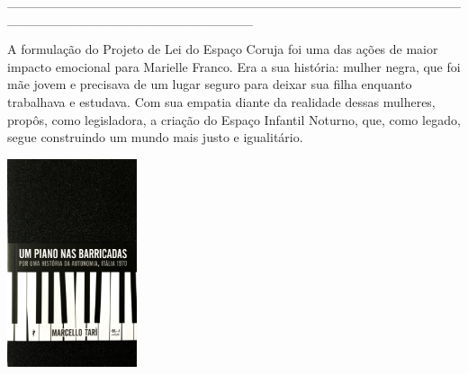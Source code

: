 {\hspace*{-2cm}\_\_\_\_\_\_\_\_\_\_\_\_\_\_\_\_\_\_\_\_\_\_\_\_\_\_\_\_\_\_\_\_\_\_\_\_\_\_\_\_\_\_\_\_\_\_\_\_\_\_\_\_\_\_\_\_\_\_\_\_\_\_\_\_\_\_\_\_\_\_\_\_\_\_

\medskip

\noindent{}A formulação do Projeto de Lei do Espaço Coruja foi uma das ações de maior impacto emocional para Marielle Franco. Era a sua história: mulher negra, que foi mãe jovem e precisava de um lugar seguro para deixar sua filha enquanto trabalhava e estudava. Com sua empatia diante da realidade dessas mulheres, propôs, como legisladora, a criação do Espaço Infantil Noturno, que, como legado, segue construindo um mundo mais justo e igualitário.

\vfill

\hspace*{-.4cm}\begin{minipage}[c]{0.90\linewidth}
\small{
{}}
\end{minipage}

\pagebreak

\hspace{.5cm}

\begin{center}
\hspace*{-2.8cm}
\hspace*{2.5cm}\includegraphics[width=38mm]{./imgs/barricada.png}
\end{center}

}
